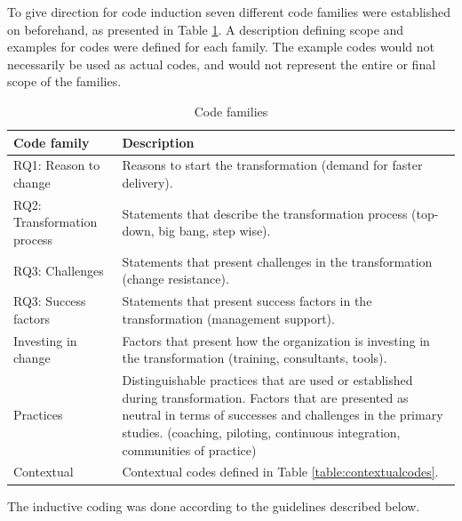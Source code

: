 \documentclass[preprint,authoryear,12pt]{elsarticle}
\begin{document}
To give direction for code induction seven different code families were
established on beforehand, as presented in Table \ref{table:codefamilies}. A
description defining scope and examples for codes were defined for each family.
The example codes would not necessarily be used as actual codes, and would not
represent the entire or final scope of the families.

\begin{table}[t]
    \centering
    \begin{tabular}{ >{\raggedright\arraybackslash}p{}
                     >{\raggedright\arraybackslash}p{} }
        \toprule
        Code family          &  Description
        \\
        \midrule

        RQ1: Reason to change &
        Reasons to start the transformation (demand for faster delivery). \\

		RQ2: Transformation process &
		Statements that describe the transformation process (top-down, big bang,
		step wise). \\

		RQ3: Challenges &
		Statements that present challenges in the transformation (change resistance).
		\\

		RQ3: Success factors &
		Statements that present success factors in the transformation (management
		support).
		\\

		Investing in change  &
		Factors that present how the organization is investing in the
		transformation (training, consultants, tools). \\

		Practices &
		Distinguishable practices that are used or established during transformation.
		Factors that are presented as neutral in terms of successes and challenges
		in the primary studies.
		(coaching, piloting, continuous integration, communities of practice) \\
		
		Contextual &
		Contextual codes defined in Table \ref{table:contextualcodes}. \\
		
        \bottomrule
    \end{tabular}
    \caption{Code families}
    \label{table:codefamilies}
\end{table}

The inductive coding was done according to the guidelines described below.
\end{document}
